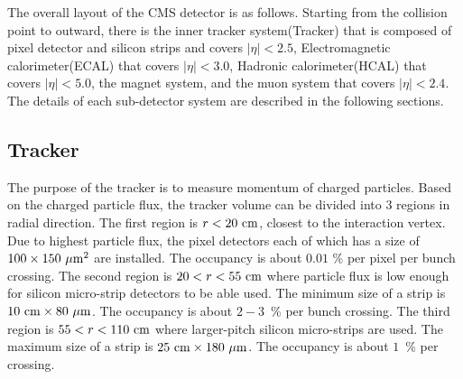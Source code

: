 The overall layout of the CMS detector is as follows. 
Starting from the collision point to outward, there is the inner tracker system(Tracker) 
that is composed of pixel detector and silicon strips and covers $|\eta|<2.5$, 
Electromagnetic calorimeter(ECAL) that covers  $|\eta|<3.0$, 
Hadronic calorimeter(HCAL) that covers  $|\eta|<5.0$, the magnet system, 
and the muon system that covers  $|\eta|<2.4$. 
The details of each sub-detector system are described in the following sections. 





\subsection{Tracker}

The purpose of the tracker is to measure momentum of charged particles. 
Based on the charged particle flux, the tracker volume can be divided 
into 3 regions in radial direction. The first region is $r<20~\mathrm{cm}$, closest 
to the interaction vertex. Due to highest particle flux, the pixel detectors 
each of which has a size of $100 \times 150~\mu\mathrm{m}^2$ are installed. 
The occupancy is about $0.01$ \% per pixel per bunch crossing. 
The second region is $20<r<55~\mathrm{cm}$ where particle flux is low enough 
for silicon micro-strip detectors to be able used. 
The minimum size of a strip is $10~\mathrm{cm} \times 80~\mu\mathrm{m}$.
The occupancy is about $2-3$~\% per bunch crossing. 
The third region is $55<r<110~\mathrm{cm}$ where larger-pitch silicon micro-strips
are used. The maximum size of a strip is $25~\mathrm{cm} \times 180~\mu\mathrm{m}$.
The occupancy is about $1$~\% per crossing. 

